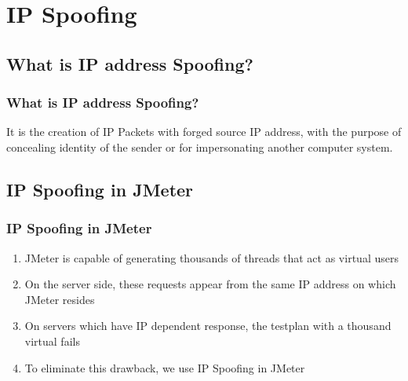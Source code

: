\documentclass[12pt]{beamer}
\newcommand\FontviHead{\fontsize{25}{10}\sffamily}
\begin{document}
\section{IP Spoofing}
\begin{frame}
 \begin{center}
    \FontviHead{IP Spoofing}
 \end{center}

 
\end{frame}

\subsection{What is IP address Spoofing?}
\begin{frame}[c]
\frametitle{What is IP address Spoofing?}
It is the creation of IP Packets with forged source IP address, with the purpose of concealing identity of the sender or for impersonating another computer system.
\end{frame}

\subsection{IP Spoofing in JMeter}
\begin{frame}[c]
\frametitle{IP Spoofing in JMeter}
\begin{enumerate}
\item JMeter is capable of generating thousands of threads that act as virtual users
\item On the server side, these requests appear from the same IP address on which JMeter resides
\item On servers which have IP dependent response, the testplan with a thousand virtual fails
\item To eliminate this drawback, we use IP Spoofing in JMeter
\end{enumerate}
 \end{frame}

 
\end{document}
